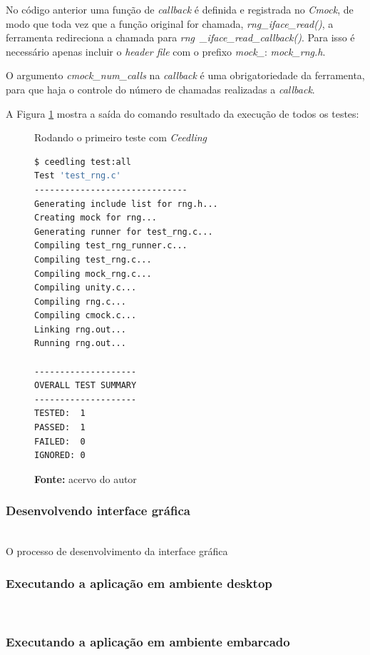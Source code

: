 \documentclass[times, twoside, watermark]{artigo}
\begin{document}
No código anterior uma função de \textit{callback} é definida e registrada no
\textit{Cmock}, de modo que toda vez que a função original for chamada,
\textit{rng\_iface\_read()}, a ferramenta redireciona a chamada para
\textit{rng~\_iface\_read\_callback()}. Para isso é necessário apenas incluir
o \textit{header file} com o prefixo \textit{mock\_}: \textit{mock\_rng.h}.

O argumento \textit{cmock\_num\_calls} na \textit{callback} é uma obrigatoriedade
da ferramenta, para que haja o controle do número de chamadas realizadas a
\textit{callback}.

A Figura \ref{fig:ceedling-output} mostra a saída do comando resultado da execução
de todos os testes:\hfill\\

\begin{figure}[H]
  \centering
  \caption{Rodando o primeiro teste com \textit{Ceedling}}
\begin{lstlisting}[language=bash]
$ ceedling test:all
Test 'test_rng.c'
------------------------------
Generating include list for rng.h...
Creating mock for rng...
Generating runner for test_rng.c...
Compiling test_rng_runner.c...
Compiling test_rng.c...
Compiling mock_rng.c...
Compiling unity.c...
Compiling rng.c...
Compiling cmock.c...
Linking rng.out...
Running rng.out...

--------------------
OVERALL TEST SUMMARY
--------------------
TESTED:  1
PASSED:  1
FAILED:  0
IGNORED: 0
\end{lstlisting}
  \label{fig:ceedling-output}
  \caption*{\newline\textbf{Fonte:} acervo do autor}
\end{figure}

\subsubsection{Desenvolvendo interface gráfica}\hfill\\

O processo de desenvolvimento da interface gráfica 

\subsubsection{Executando a aplicação em ambiente desktop}\hfill\\


\subsubsection{Executando a aplicação em ambiente embarcado}\hfill\\
\end{document}
